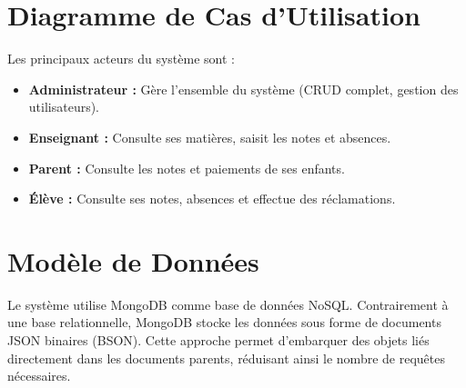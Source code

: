 \documentclass[12pt,a4paper,twoside]{report}
\begin{document}
\section{Diagramme de Cas d'Utilisation}

Les principaux acteurs du système sont :
\begin{itemize}[leftmargin=*]
  \item \textbf{Administrateur :} Gère l'ensemble du système (CRUD complet, gestion des utilisateurs).
  \item \textbf{Enseignant :} Consulte ses matières, saisit les notes et absences.
  \item \textbf{Parent :} Consulte les notes et paiements de ses enfants.
  \item \textbf{Élève :} Consulte ses notes, absences et effectue des réclamations.
\end{itemize}

\section{Modèle de Données}

Le système utilise MongoDB comme base de données NoSQL. Contrairement à une base relationnelle, MongoDB stocke les données sous forme de documents JSON binaires (BSON). Cette approche permet d'embarquer des objets liés directement dans les documents parents, réduisant ainsi le nombre de requêtes nécessaires.
\end{document}
